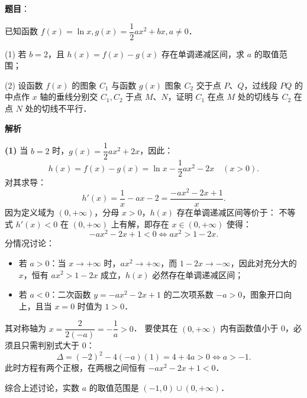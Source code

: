\begin{answer}

\textbf{题目}：

已知函数 $f(x) = \ln x, g(x) = \dfrac{1}{2}ax^2 + bx, a \neq 0$．

(1) 若 $b = 2$，且 $h(x) = f(x) - g(x)$ 存在单调递减区间，求 $a$ 的取值范围；

(2) 设函数 $f(x)$ 的图象 $C_1$ 与函数 $g(x)$ 图象 $C_2$ 交于点 $P$、$Q$，过线段 $PQ$ 的中点作 $x$ 轴的垂线分别交 $C_1, C_2$ 于点 $M$、$N$，证明 $C_1$ 在点 $M$ 处的切线与 $C_2$ 在点 $N$ 处的切线不平行．

\textbf{解析}

\textbf{(1)}
当 $b = 2$ 时，$g(x) = \dfrac{1}{2}ax^2 + 2x$，因此：
\nopagebreak[4]
\[
h(x) = f(x) - g(x) = \ln x - \frac{1}{2}ax^2 - 2x \quad (x > 0).
\]
对其求导：
\nopagebreak[4]
\[
h'(x) = \frac{1}{x} - ax - 2 = \frac{-ax^2 - 2x + 1}{x}.
\]
因为定义域为 $(0, +\infty)$，分母 $x > 0$，$h(x)$ 存在单调递减区间等价于：
不等式 $h'(x) < 0$ 在 $(0, +\infty)$ 上有解，即存在 $x \in (0, +\infty)$ 使得：
\nopagebreak[4]
\[
-ax^2 - 2x + 1 < 0 \iff ax^2 > 1 - 2x.
\]
分情况讨论：
\begin{itemize}
\item 若 $a > 0$：当 $x \to +\infty$ 时，$ax^2 \to +\infty$，而 $1 - 2x \to -\infty$，因此对充分大的 $x$，恒有 $ax^2 > 1 - 2x$ 成立，$h(x)$ 必然存在单调递减区间；
\item 若 $a < 0$：二次函数 $y = -ax^2 - 2x + 1$ 的二次项系数 $-a > 0$，图象开口向上，且当 $x = 0$ 时值为 $1 > 0$．
\end{itemize}
  其对称轴为 $x = \dfrac{2}{2(-a)} = -\dfrac{1}{a} > 0$．
  要使其在 $(0, +\infty)$ 内有函数值小于 0，必须且只需判别式大于 0：
\nopagebreak[4]
\[
\Delta = (-2)^2 - 4(-a)(1) = 4 + 4a > 0 \iff a > -1.
\]
  此时方程有两个正根，在两根之间恒有 $-ax^2 - 2x + 1 < 0$．

综合上述讨论，实数 $a$ 的取值范围是 $(-1, 0) \cup (0, +\infty)$．


\end{answer}
